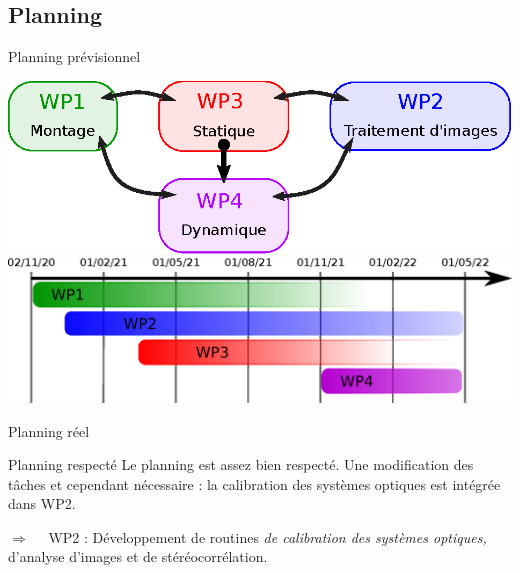 \documentclass[8pt]{beamer}
\begin{document}
\subsection{Planning}
	\begin{frame}{Planning prévisionnel}
		\begin{center}
			\includegraphics[width=.6\textwidth]{taches_small.eps}\vspace{2em}\\
			\includegraphics[width=.8\textwidth]{gant.eps}
		\end{center}
	\end{frame}
	\begin{frame}{Planning réel}
		\begin{center}
		\end{center}
		\begin{exampleblock}{Planning respecté}
			Le planning est assez bien respecté. Une modification des tâches et cependant nécessaire : la calibration des systèmes optiques est intégrée dans WP2. \vspace{.5em}
			\begin{center}
			$\Rightarrow\quad$ WP2 : Développement de routines \emph{de calibration des systèmes optiques,} d’analyse d’images et de stéréocorrélation.
			\end{center}
		\end{exampleblock}
	\end{frame}
\end{document}
